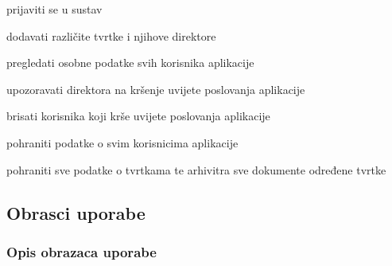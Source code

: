 \begin{packed_enum}
\begin{packed_enum}
					\item prijaviti se u sustav
					\item dodavati različite tvrtke i njihove direktore
					\item pregledati osobne podatke svih korisnika aplikacije
					\item upozoravati direktora na kršenje uvijete poslovanja aplikacije
					\item brisati korisnika koji krše uvijete poslovanja aplikacije
					
				\end{packed_enum}
				
				\item  {}
				\begin{packed_enum}
					
					\item pohraniti podatke o svim korisnicima aplikacije
					\item pohraniti sve podatke o tvrtkama te arhivitra sve dokumente određene tvrtke
					
				\end{packed_enum}
				
				
			\end{packed_enum}
			
			\eject 
			
			
				
			\subsection{Obrasci uporabe}
							
				\subsubsection{Opis obrazaca uporabe}

